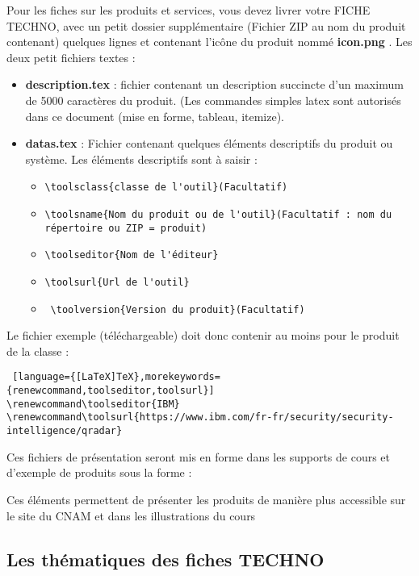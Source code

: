 Pour les fiches sur les produits et services,  vous devez livrer votre FICHE TECHNO, avec un petit dossier  supplémentaire (Fichier ZIP au nom du produit contenant)  quelques lignes et contenant l'icône du produit nommé \textbf{icon.png} . Les deux petit fichiers textes  :

\begin{itemize}

  \item  \textbf{description.tex } : fichier contenant un description succincte d'un maximum de 5000 caractères  du produit. (Les commandes simples latex sont autorisés dans ce document (mise en forme, tableau, itemize).
  \item  \textbf{datas.tex} : Fichier contenant quelques éléments descriptifs du produit ou système. Les éléments descriptifs sont à saisir :
\begin{itemize}
 \item \verb|\toolsclass{classe de l'outil}(Facultatif)|
 \item \verb|\toolsname{Nom du produit ou de l'outil}(Facultatif : nom du  répertoire ou ZIP = produit)|
 \item \verb|\toolseditor{Nom de l'éditeur}|
\item \verb|\toolsurl{Url de l'outil}|
\item \ \verb|\toolversion{Version du produit}(Facultatif)|
\end{itemize}
\end{itemize}

Le fichier  exemple (téléchargeable)   doit donc contenir au moins pour le produit  de la classe  : 

\begin{lstlisting} [language={[LaTeX]TeX},morekeywords={renewcommand,toolseditor,toolsurl}]
\renewcommand\toolseditor{IBM}
\renewcommand\toolsurl{https://www.ibm.com/fr-fr/security/security-intelligence/qradar}
\end{lstlisting}

Ces fichiers de présentation seront mis en forme dans les supports de cours et d'exemple de produits sous la forme :


Ces éléments permettent de présenter les produits de manière plus accessible sur le site du CNAM et dans les illustrations du cours

\subsection{Les thématiques des fiches TECHNO}

